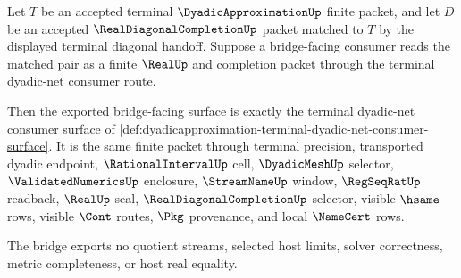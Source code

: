 \begin{theorem}
\label{thm:dyadicapproximation-terminal-dyadic-net-bridge}
Let $T$ be an accepted terminal $\DyadicApproximationUp$ finite packet, and
let $D$ be an accepted $\RealDiagonalCompletionUp$ packet matched to $T$ by
the displayed terminal diagonal handoff. Suppose a bridge-facing consumer
reads the matched pair as a finite $\RealUp$ and completion packet through
the terminal dyadic-net consumer route.

Then the exported bridge-facing surface is exactly the terminal dyadic-net
consumer surface of
\autoref{def:dyadicapproximation-terminal-dyadic-net-consumer-surface}. It is
the same finite packet through terminal precision, transported dyadic
endpoint, $\RationalIntervalUp$ cell, $\DyadicMeshUp$ selector,
$\ValidatedNumericsUp$ enclosure, $\StreamNameUp$ window, $\RegSeqRatUp$
readback, $\RealUp$ seal, $\RealDiagonalCompletionUp$ selector, visible
$\hsame$ rows, visible $\Cont$ routes, $\Pkg$ provenance, and local
$\NameCert$ rows.

The bridge exports no quotient streams, selected host limits, solver
correctness, metric completeness, or host real equality.
\end{theorem}

